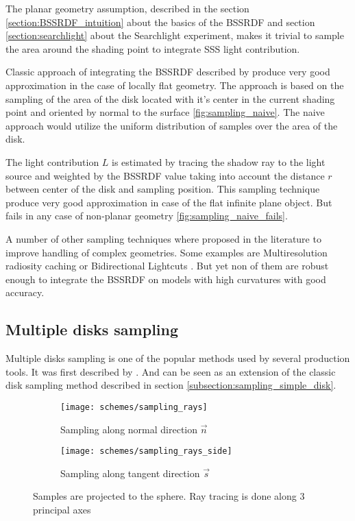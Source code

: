 The planar geometry assumption, described in the section \ref{section:BSSRDF_intuition} about the
basics of the BSSRDF and section \ref{section:searchlight} about the  Searchlight experiment, makes
it trivial to sample the area around the shading point to integrate SSS light contribution.

Classic approach of integrating the BSSRDF described by \cite{Jensen:2001:PMS:383259.383319} 
produce very good approximation in the case of locally flat geometry. The approach is based on the
sampling of the area of the disk located with it's center in the current shading point and oriented
by normal to the surface \ref{fig:sampling_naive}. The naive approach would
utilize the uniform distribution of samples over the area of the disk.

The light contribution $L$ is estimated by tracing the shadow ray to the light source and
weighted by the BSSRDF value taking into account the distance $r$ between center of the disk and
sampling position. This sampling technique produce very good approximation in case of the flat
infinite plane object. But fails in any case of non-planar geometry
\ref{fig:sampling_naive_fails}.

A number of other sampling techniques where proposed in the literature to improve handling of
complex geometries. Some examples are Multiresolution radiosity caching
\cite{Christensen:2012:MRC:2343045.2343108} or Bidirectional Lightcuts
\cite{Walter:2012:BL:2185520.2185555}. But yet non of them are robust enough to integrate the BSSRDF
on models with high curvatures with good accuracy.

\subsection{Multiple disks sampling}
Multiple disks sampling is one of the popular methods used by several production tools. It was first
described by \cite{King:2013:BIS:2504459.2504520}. And can be seen as an extension of the classic
disk sampling method described in section \ref{subsection:sampling_simple_disk}.
\begin{figure}[h]
    \centering
    \begin{subfigure}{0.45\textwidth}
        \texttt{[image: schemes/sampling\_rays]}
        \caption{Sampling along normal direction $\vec{n}$}
        \label{fig:sampling_rays_n}
    \end{subfigure}
    \quad
    \begin{subfigure}{0.45\textwidth}
        \texttt{[image: schemes/sampling\_rays\_side]}
        \caption{Sampling along tangent direction $\vec{s}$}
    \end{subfigure}
    \caption{Samples are projected to the sphere. Ray tracing is done along 3 principal axes}
    \label{fig:sampling_rays}
\end{figure}

